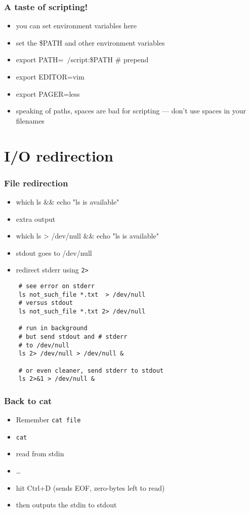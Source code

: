 \documentclass[%
        hyperref={%
                pdfauthor={Zakariyya Mughal},%
                pdfpagemode={None},pdfpagelayout={SinglePage}}%
        xcolor={x11names},%
]{beamer}
\begin{document}
\begin{frame}
	\frametitle{A taste of scripting!}
	\begin{itemize}
		\item you can set environment variables here
		\item set the \$PATH and other environment variables
		\item export PATH=~/script:\$PATH \# prepend
		\item export EDITOR=vim
		\item export PAGER=less
		\pause\item speaking of paths, spaces are bad for scripting --- don't use spaces in your filenames
	\end{itemize}
\end{frame}

\section{I/O redirection}\frame{\insertsection}
\begin{frame}[fragile]
	\frametitle{File redirection}
	\begin{itemize}
		\item which ls \&\& echo "ls is available"
		\pause\item extra output
		\pause\item which ls > /dev/null \&\& echo "ls is available"
		\pause\item stdout goes to /dev/null
		\pause\item redirect stderr using \texttt{2>}
	\end{itemize}
\end{frame}
\begin{frame}[fragile]
\begin{lstlisting}
	# see error on stderr
	ls not_such_file *.txt  > /dev/null
	# versus stdout
	ls not_such_file *.txt 2> /dev/null

	# run in background
	# but send stdout and # stderr
	# to /dev/null
	ls 2> /dev/null > /dev/null &

	# or even cleaner, send stderr to stdout
	ls 2>&1 > /dev/null &
\end{lstlisting}
\end{frame}
\begin{frame}
	\frametitle{Back to cat}
	\begin{itemize}
		\item Remember \texttt{cat file}
		\pause\item \texttt{cat}
		\item read from stdin
		\item \ldots
		\pause\item hit Ctrl+D (sends EOF, zero-bytes left to
			read)
		\pause\item then outputs the stdin to stdout
	\end{itemize}
\end{frame}
\end{document}
